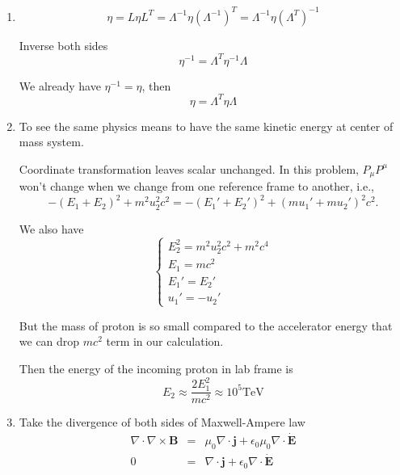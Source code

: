\documentclass[12pt,a4paper]{article}
\begin{document}
\begin{enumerate}
\item
\begin{equation}
	\eta = L\eta L^T = \Lambda^{-1} \eta(\Lambda^{-1})^T = \Lambda^{-1} \eta(\Lambda^{T})^{-1}
\end{equation}

Inverse both sides
\begin{equation}
	\eta^{-1} = \Lambda^T \eta^{-1} \Lambda
\end{equation}

We already have $\eta^{-1} = \eta$, then
\begin{equation}
	\eta = \Lambda^T \eta \Lambda
\end{equation}



\item
To see the same physics means to have the same kinetic energy at center of mass system.

Coordinate transformation leaves scalar unchanged. In this problem, $P_\mu P^\mu$ won't change when we change from one reference frame to another, i.e.,
\begin{equation*}
	-(E_1 + E_2)^2 + m^2 u_2^2c^2 = -(E_1' + E_2')^2 + (m u_1' + m u_2')^2c^2 .
\end{equation*}

We also have
\begin{equation}
	\begin{cases}
	E_2^2=m^2 u_2^2 c^2 + m^2 c^4 \\
	E_1=mc^2 \\
	E_1'=E_2'\\
	u_1'=-u_2'
	\end{cases}
\end{equation}

But the mass of proton is so small compared to the accelerator energy that we can drop $mc^2$ term in our calculation.

Then the energy of the incoming proton in lab frame is
\begin{equation}
	E_2 \approx \frac{2 E_1^2}{mc^2} \approx 10^5 \text{TeV}
\end{equation}




\item

Take the divergence of both sides of Maxwell-Ampere law
\begin{eqnarray}
	\nabla \cdot \nabla \times \mathbf B &=& \mu_0 \nabla\cdot\mathbf j + \epsilon_0 \mu_0 \nabla\cdot\dot{\mathbf E} \\
	0 &=& \nabla\cdot \mathbf j + \epsilon_0\nabla\cdot \dot{\mathbf E}
\end{eqnarray}


\end{enumerate}
\end{document}
